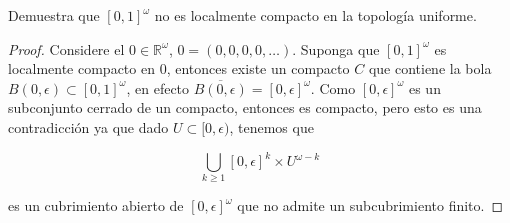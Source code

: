 
\item Demuestra que $[0,1]^\omega$ no es localmente compacto en la topología uniforme.

\begin{proof}
    Considere el $0\in \mathbb{R}^{\omega}$, $0=(0,0,0,0,\ldots)$. Suponga que $[0,1]^\omega$ es localmente compacto en $0$, entonces existe un compacto $C$ que contiene la bola $B(0,\epsilon)\subset[0,1]^\omega$, en efecto $\overline{B(0,\epsilon)}=[0,\epsilon]^\omega$. Como $[0,\epsilon]^\omega$ es un subconjunto cerrado de un compacto, entonces es compacto, pero esto es una contradicción ya que dado $U\subset [0,\epsilon)$, tenemos que

    $$\bigcup_{k\geq 1}[0,\epsilon]^{k}\times U^{\omega-k} 
        $$

    es un cubrimiento abierto de $[0,\epsilon]^{\omega}$ que no admite un subcubrimiento finito.
\end{proof}